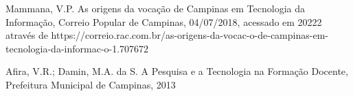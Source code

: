 \documentclass[
12pt,		%
openright,	%
twoside,  %
a4paper,			%
chapter=TITLE,		%
english,			%
french,				%
spanish,			%
brazil				%
]{USPSC-classe/USPSC}
\begin{document}
\begin{flushleft}
\begin{flushleft}
\begin{flushleft}
\begin{flushleft}
\begin{flushleft}
\begin{flushleft}
\begin{flushleft}
\begin{flushleft}
[MAMMANA, 2018] Mammana, V.P. As origens da voca\c{c}\~ao de Campinas em Tecnologia da Informa\c{c}\~ao, Correio Popular de Campinas, 04/07/2018, acessado em 20222 atrav\'es de https://correio.rac.com.br/as-origens-da-vocac-o-de-campinas-em-tecnologia-da-informac-o-1.707672
\end{flushleft}


\end{flushleft}


\end{flushleft}


\end{flushleft}


\end{flushleft}


\end{flushleft}


\end{flushleft}


\end{flushleft}


\begin{flushleft}
\begin{flushleft}
\begin{flushleft}
\begin{flushleft}
\begin{flushleft}
\begin{flushleft}
\begin{flushleft}
\begin{flushleft}
[AFIRA, 2013] Afira, V.R.; Damin, M.A. da S. A Pesquisa e a Tecnologia na Forma\c{c}\~ao Docente, Prefeitura Municipal de Campinas, 2013
\end{flushleft}


\end{flushleft}


\end{flushleft}


\end{flushleft}


\end{flushleft}


\end{flushleft}


\end{flushleft}


\end{flushleft}
\end{document}
